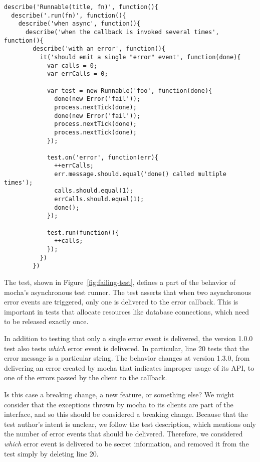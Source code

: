 \begin{figure*}
\begin{lstlisting}
describe('Runnable(title, fn)', function(){
  describe('.run(fn)', function(){
    describe('when async', function(){
      describe('when the callback is invoked several times', function(){
        describe('with an error', function(){
          it('should emit a single "error" event', function(done){
            var calls = 0;
            var errCalls = 0;

            var test = new Runnable('foo', function(done){
              done(new Error('fail'));
              process.nextTick(done);
              done(new Error('fail'));
              process.nextTick(done);
              process.nextTick(done);
            });

            test.on('error', function(err){
              ++errCalls;
              err.message.should.equal('done() called multiple times');
              calls.should.equal(1);
              errCalls.should.equal(1);
              done();
            });

            test.run(function(){
              ++calls;
            });
          })
        })
\end{lstlisting}
\caption{A failing mocha ``jsapi'' test}
\label{fig:failing-test}
\end{figure*}

The test, shown in Figure~\ref{fig:failing-test}, defines a
part of the behavior of mocha's asynchronous test runner. The test 
asserts that when two asynchronous error events are triggered, only one
is delivered to the error callback. This is important in tests that
allocate resources like database connections, which need to be released
exactly once.

In addition to testing that only a single error event is delivered,
the version 1.0.0 test also tests {\em which} error event is
delivered. In particular, line 20 tests that the error message is a
particular string. The behavior changes at version 1.3.0, from
delivering an error created by mocha that indicates improper usage of
its API, to one of the errors passed by the client to the callback.

Is this case a breaking change, a new feature, or something else?
We might consider that the exceptions thrown by mocha to its clients
are part of the interface, and so this should be considered a breaking
change. Because that the test author's intent is unclear, we follow the
test description, which mentions only the number of error events that
should be delivered. Therefore, we considered {\em which} error event
is delivered to be secret information, and removed it from the test
simply by deleting line 20.


